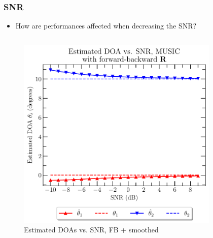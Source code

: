 \documentclass[UKenglish,8pt,aspectratio=1610]{beamer}
\begin{document}
\begin{frame}
	\frametitle{SNR}
\begin{itemize}
	\item How are performances affected when decreasing the SNR?
\end{itemize}
\begin{columns}
	\begin{column}{0.5\textwidth}
		\begin{figure}[h!]
			\vspace{-15pt}
			\centering
			\includegraphics[scale=0.35]{snr_analysis/DOA_estimation_vs_snr_forward_backward_correlation_matrix.pdf}
			\caption{Estimated DOAs vs. SNR, FB + smoothed}
		\end{figure}
	\end{column}
	\begin{column}{0.5\textwidth}
		\begin{figure}[h!]
		\vspace{-15pt}
		\centering

\end{figure}
\end{column}
\end{columns}
\end{frame}
\end{document}
